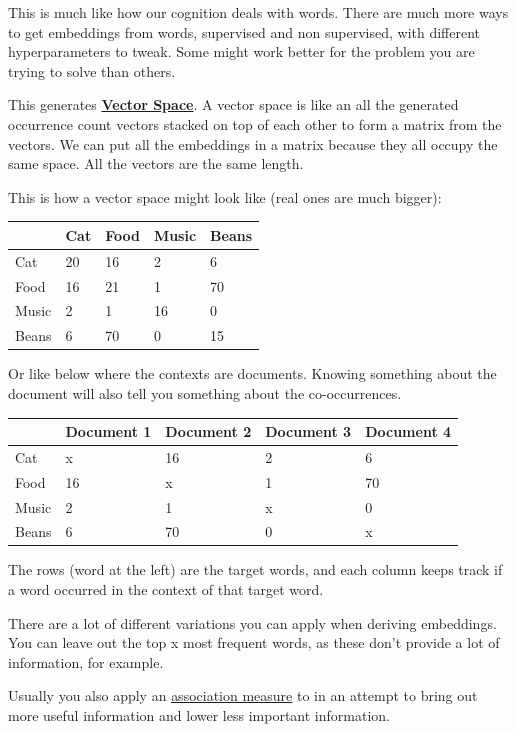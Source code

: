 \documentclass[
  11pt,
  british,
]{article}
\begin{document}
This is much like how our cognition deals with words. There are much
more ways to get embeddings from words, supervised and non supervised,
with different hyperparameters to tweak. Some might work better for the
problem you are trying to solve than others.

This generates \textbf{\href{Vector\%20Space.md}{Vector Space}}. A
vector space is like an all the generated occurrence count vectors
stacked on top of each other to form a matrix from the vectors. We can
put all the embeddings in a matrix because they all occupy the same
space. All the vectors are the same length.

This is how a vector space might look like (real ones are much bigger):

\begin{longtable}[]{@{}lllll@{}}
\toprule
& Cat & Food & Music & Beans \\
\midrule
\endhead
Cat & 20 & 16 & 2 & 6 \\
Food & 16 & 21 & 1 & 70 \\
Music & 2 & 1 & 16 & 0 \\
Beans & 6 & 70 & 0 & 15 \\
\bottomrule
\end{longtable}

Or like below where the contexts are documents. Knowing something about
the document will also tell you something about the co-occurrences.

\begin{longtable}[]{@{}lllll@{}}
\toprule
& Document 1 & Document 2 & Document 3 & Document 4 \\
\midrule
\endhead
Cat & x & 16 & 2 & 6 \\
Food & 16 & x & 1 & 70 \\
Music & 2 & 1 & x & 0 \\
Beans & 6 & 70 & 0 & x \\
\bottomrule
\end{longtable}

The rows (word at the left) are the target words, and each column keeps
track if a word occurred in the context of that target word.

There are a lot of different variations you can apply when deriving
embeddings. You can leave out the top x most frequent words, as these
don't provide a lot of information, for example.

Usually you also apply an \href{Association\%20measure.md}{association
measure} to in an attempt to bring out more useful information and lower
less important information.
\end{document}
